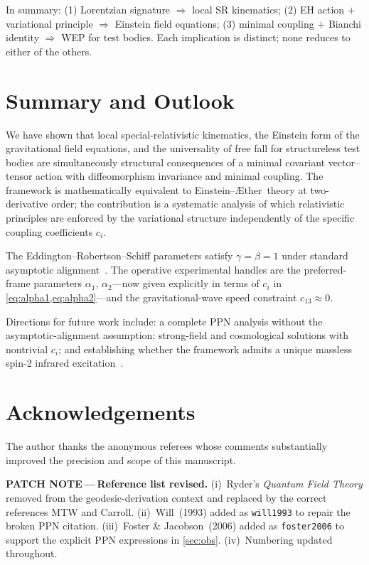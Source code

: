 \documentclass[12pt,a4paper]{article}
\newcommand{\patchnote}[1]{%
  \begin{patchbox}
    {\small\color{patchtext}\textbf{PATCH NOTE\,---\,}#1}
  \end{patchbox}}
\newcommand{\Aether}{\AE ther}
\begin{document}
In summary: (1) Lorentzian signature $\Rightarrow$ local SR kinematics;
(2) EH action $+$ variational principle $\Rightarrow$ Einstein field equations;
(3) minimal coupling $+$ Bianchi identity $\Rightarrow$ WEP for test bodies.
Each implication is distinct; none reduces to either of the others.

\section{Summary and Outlook}
\label{sec:summary}

We have shown that local special-relativistic kinematics, the Einstein form of
the gravitational field equations, and the universality of free fall for
structureless test bodies are simultaneously structural consequences of a
minimal covariant vector--tensor action with diffeomorphism invariance and
minimal coupling. The framework is mathematically equivalent to
Einstein--\Aether\ theory at two-derivative order; the contribution is a
systematic analysis of which relativistic principles are enforced by the
variational structure independently of the specific coupling coefficients
$c_{i}$.

The Eddington--Robertson--Schiff parameters satisfy $\gamma=\beta=1$ under
standard asymptotic alignment~\citep{foster2006}. The operative experimental
handles are the preferred-frame parameters $\alpha_{1}$, $\alpha_{2}$---now
given explicitly in terms of $c_{i}$ in \cref{eq:alpha1,eq:alpha2}---and the
gravitational-wave speed constraint $c_{13}\approx 0$.

Directions for future work include: a complete PPN analysis without the
asymptotic-alignment assumption; strong-field and cosmological solutions with
nontrivial $c_{i}$; and establishing whether the framework admits a unique
massless spin-2 infrared
excitation~\citep{weinberg1972,weinberg1965}.

\section*{Acknowledgements}
The author thanks the anonymous referees whose comments substantially improved
the precision and scope of this manuscript.

\patchnote{\textbf{Reference list revised.}
(i)~Ryder's \emph{Quantum Field Theory} removed from the geodesic-derivation
context and replaced by the correct references MTW and Carroll.
(ii)~Will~(1993) added as \texttt{will1993} to repair the broken PPN citation.
(iii)~Foster \& Jacobson~(2006) added as \texttt{foster2006} to support the
explicit PPN expressions in \cref{sec:obs}.
(iv)~Numbering updated throughout.}
\end{document}
